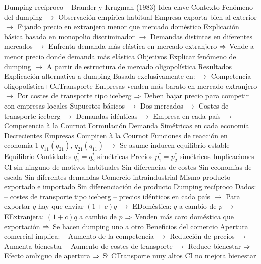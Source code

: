 \documentclass{nuevotema}
\begin{document}
\begin{esquemal}
	\1 
		\2 Dumping recíproco -- Brander y Krugman (1983)
			\3 Idea clave
				\4 Contexto
				\4[] Fenómeno del dumping
				\4[] $\to$ Observación empírica habitual
				\4[] Empresa exporta bien al exterior
				\4[] $\to$ Fijando precio en extranjero menor que mercado doméstico
				\4[] Explicación básica basada en monopolio discriminador
				\4[] $\to$ Demandas distintas en diferentes mercados
				\4[] $\to$ Enfrenta demanda más elástica en mercado extranjero
				\4[] $\Rightarrow$ Vende a menor precio donde demanda más elástica
				\4 Objetivos
				\4[] Explicar fenómeno de dumping
				\4[] $\to$ A partir de estructura de mercado oligopolística
				\4 Resultados
				\4[] Explicación alternativa a dumping
				\4[] Basada exclusivamente en:
				\4[] $\to$ Competencia oligopolística+CdTransporte
				\4[] Empresas venden más barato en mercado extranjero
				\4[] $\to$ Por costes de transporte tipo iceberg
				\4[] $\Rightarrow$ Deben bajar precio para competir con empresas locales
				\4[] Supuestos básicos
				\4[] $\to$ Dos mercados
				\4[] $\to$ Costes de transporte iceberg
				\4[] $\to$ Demandas idénticas
				\4[] $\to$ Empresa en cada país
				\4[] $\to$ Competencia à la Cournot
			\3 Formulación
				\4 Demanda
				\4[] Simétricas en cada economía
				\4[] Decrecientes
				\4 Empresas
				\4[] Compiten à la Cournot
				\4[] Funciones de reacción en economía 1
				\4[] $q_{11} (q_{21})$, $q_{21}(q_{11})$
				\4[] $\to$ Se asume inducen equilibrio estable
				\4 Equilibrio
				\4[] Cantidades $q_1^* = q_2^*$ simétricas
				\4[] Precios $p_1^* = p_2^*$ simétricos
			\3 Implicaciones
				\4 CI sin ninguno de motivos habituales
				\4[] Sin diferencias de costes
				\4[] Sin economías de escala
				\4[] Sin diferentes demandas
				\4 Comercio intraindustrial
				\4[] Mismo producto exportado e importado
				\4[] Sin diferenciación de producto
				\4 \underline{Dumping recíproco}
				\4[] Dados:
				\4[] -- costes de transporte tipo iceberg
				\4[] -- precios idénticos en cada país
				\4[] $\to$ Para exportar $q$ hay que enviar $(1+c)q$
				\4[] $\to$ EDoméstica: $q$ a cambio de $p$
				\4[] $\to$ EExtranjera: $(1+c)q$ a cambio de $p$
				\4[] $\Rightarrow$ Venden más caro doméstica que exportación
				\4[] $\Rightarrow$ Se hacen dumping uno a otro
				\4 Beneficios del comercio
				\4[] Apertura comercial implica:
				\4[] -- Aumento de la competencia
				\4[] $\to$ Reducción de precios
				\4[] $\to$ Aumenta bienestar
				\4[] -- Aumento de costes de transporte
				\4[] $\to$ Reduce bienestar
				\4[] $\Rightarrow$ Efecto ambiguo de apertura
				\4[] $\Rightarrow$ Si CTransporte muy altos CI no mejora bienestar

\end{esquemal}
\end{document}
